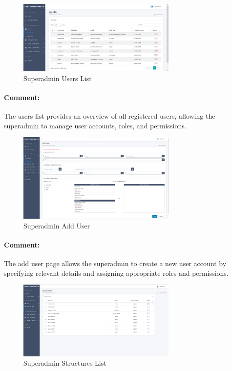 \begin{itemize}
\begin{figure}[htbp]
  \centering
  \includegraphics[width=0.7\textwidth]{SCREENSHOTS/superadmin/users_list.png}
  \caption{Superadmin Users List}
  \label{fig:users-list}
\end{figure}
\paragraph{Comment:} The users list provides an overview of all registered users, allowing the superadmin to manage user accounts, roles, and permissions.
\newpage

\begin{figure}[htbp]
  \centering
  \includegraphics[width=0.7\textwidth]{SCREENSHOTS/superadmin/add_user.png}
  \caption{Superadmin Add User}
  \label{fig:add-user}
\end{figure}
\paragraph{Comment:} The add user page allows the superadmin to create a new user account by specifying relevant details and assigning appropriate roles and permissions.

\begin{figure}[htbp]
  \centering
  \includegraphics[width=0.7\textwidth]{SCREENSHOTS/superadmin/structures_list.png}
  \caption{Superadmin Structures List}
  \label{fig:structures-list}
\end{figure}

\end{itemize}

